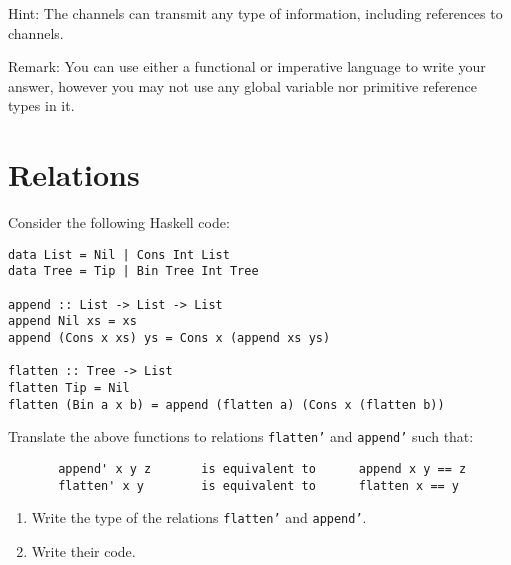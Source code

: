 \documentclass{article}
\newcommand{\answer}[1]{}
\begin{document}
Hint: The channels can transmit any type of information, including
references to channels.

Remark: You can use either a functional or imperative language to
write your answer, however you may not use any global variable nor
primitive reference types in it.

\answer{
\begin{verbatim}    
data Command a = Get (Chan a) | Set a
type Variable a = Chan (Command a)

handler :: Variable a -> a -> IO ()
handler v a = do
  command <- readChan v
  case command of
    Set a' -> handler v a'
    Get c -> do 
      writeChan c a
      handler v a

newVariable :: a -> IO (Variable a)
newVariable a = do
  c <- newChan
  forkIO (handler c a)
  return c

get :: Variable a -> IO a
get v = do
  c <- newChan
  writeChan v (Get c)
  readChan c
  
set :: Variable a -> a -> IO ()
set v a = do
  writeChan v (Set a)
\end{verbatim}
}

\newpage
\section{Relations}

Consider the following Haskell code:

\begin{verbatim}
data List = Nil | Cons Int List
data Tree = Tip | Bin Tree Int Tree

append :: List -> List -> List
append Nil xs = xs
append (Cons x xs) ys = Cons x (append xs ys)

flatten :: Tree -> List
flatten Tip = Nil
flatten (Bin a x b) = append (flatten a) (Cons x (flatten b))
\end{verbatim}

Translate the above functions to relations \texttt{flatten'} and
\texttt{append'} such that:
\begin{verbatim}
       append' x y z       is equivalent to      append x y == z
       flatten' x y        is equivalent to      flatten x == y
\end{verbatim}

\begin{enumerate}
\item Write the type of the relations \texttt{flatten'} and
  \texttt{append'}. 
\item Write their code. 
\end{enumerate}
\end{document}
